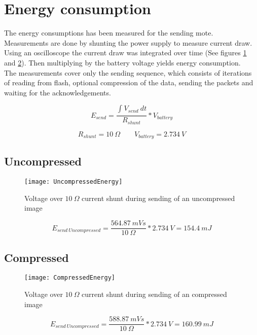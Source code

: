 \section{Energy consumption} 
\label{sec:energy_consumption}
The energy consumptions has been measured for the sending mote.
Measurements are done by shunting the power supply to measure current draw.
Using an oscilloscope the current draw was integrated over time (See figures \ref{fig:UncompressedSend} and \ref{fig:CompressedSend}).
Then multiplying by the battery voltage yields energy consumption. 
\\The measurements cover only the sending sequence, which consists of iterations of reading from flash, optional compression of the data, sending the packets and waiting for the acknowledgements. 

\begin{equation}
E_{send} = 
\dfrac{\int_{}^{}V_{send}\ dt}
{R_{shunt}}
* V_{battery}
\end{equation}

\begin{equation}
R_{shunt} = 10\ \Omega
\qquad
V_{battery} = 2.734\ V
\end{equation}


\subsection{Uncompressed}

\begin{figure}[H]
\centering
\texttt{[image: UncompressedEnergy]}
\caption{Voltage over $ 10\ \Omega $ current shunt during sending of an uncompressed image}
\label{fig:UncompressedSend}
\end{figure}

\begin{equation}
E_{send\ Uncompressed} = 
\dfrac{564.87\ mVs}
{10\ \Omega}
* 2.734\ V
=
154.4\ mJ
\end{equation}

\subsection{Compressed}

\begin{figure}[H]
\centering
\texttt{[image: CompressedEnergy]}
\caption{Voltage over $ 10\ \Omega $ current shunt during sending of an compressed image}
\label{fig:CompressedSend}
\end{figure}

\begin{equation}
E_{send\ Uncompressed} = 
\dfrac{588.87\ mVs}
{10\ \Omega}
* 2.734\ V
=
160.99\ mJ
\end{equation}



